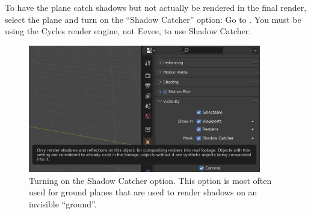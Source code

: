 \documentclass[10pt]{article}
\begin{document}
To have the plane catch shadows but not actually be rendered in the final render, select the plane and turn on the ``Shadow Catcher'' option: Go to . You must be using the Cycles render engine, not Eevee, to use Shadow Catcher.
\begin{figure}[H]
    \centering
    \includegraphics[width=4in]{images/shadow-catcher-option.png}
    \caption{Turning on the Shadow Catcher option. This option is most often used for ground planes that are used to render shadows on an invisible ``ground''.}
    \label{fig:shadow-catcher-option}
\end{figure}
\end{document}
